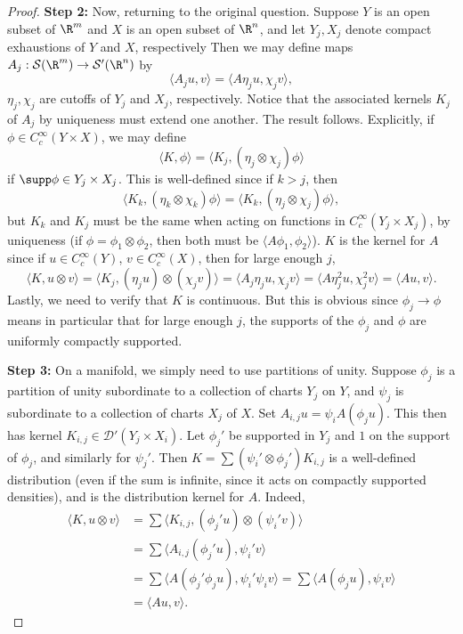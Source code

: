 \documentclass[12pt]{article}
\begin{document}
\begin{proof}
\textbf{Step 2: }Now, returning to the original question. Suppose $Y$ is an open subset of $\R^m$ and $X$ is an open subset of $\R^n$, and let $Y_j, X_j$ denote compact exhaustions of $Y$ and $X$, respectively Then we may define maps $A_j: \mathcal S(\R^m) \to \mathcal S'(\R^n)$ by
\[\langle A_ju,v\rangle = \langle A\eta_j u,\chi_j v\rangle,\] $\eta_j,\chi_j$ are cutoffs of $Y_j$ and $X_j$, respectively. Notice that the associated kernels $K_j$ of $A_j$ by uniqueness must extend one another. The result follows. Explicitly, if $\phi \in C_c^\infty(Y\times X)$, we may define
\[\langle K,\phi\rangle = \langle K_j, (\eta_j\otimes\chi_j)\phi\rangle \] if $\supp \phi \in Y_j\times X_j$. This is well-defined since if $k > j$, then 
\[\langle K_k, (\eta_k\otimes \chi_k)\phi\rangle = \langle K_k, (\eta_j\otimes \chi_j)\phi\rangle,\] but $K_k$ and $K_j$ must be the same when acting on functions in $C_c^\infty(Y_j\times X_j)$, by uniqueness (if $\phi = \phi_1\otimes \phi_2$, then both must be $\langle A\phi_1,\phi_2\rangle$). $K$ is the kernel for $A$ since if $u \in C_c^\infty(Y)$, $v \in C_c^\infty(X)$, then for large enough $j$,
\[\langle K,u\otimes v\rangle = \langle K_j,(\eta_j u)\otimes(\chi_j v)\rangle = \langle A_j \eta_j u,\chi_j v\rangle = \langle A \eta_j^2 u,\chi_j^2 v\rangle = \langle A u,v\rangle.\]
Lastly, we need to verify that $K$ is continuous. But this is obvious since $\phi_j \to \phi$ means in particular that for large enough $j$, the supports of the $\phi_j$ and $\phi$ are uniformly compactly supported.

\textbf{Step 3: }On a manifold, we simply need to use partitions of unity. Suppose $\phi_j$ is a partition of unity subordinate to a collection of charts $Y_j$ on $Y$, and $\psi_j$ is subordinate to a collection of charts $X_j$ of $X$. Set $A_{i,j}u = \psi_iA(\phi_j u)$. This then has kernel $K_{i,j} \in \mathcal D'(Y_j\times X_i)$. Let $\phi_j'$ be supported in $Y_j$ and $1$ on the support of $\phi_j$, and similarly for $\psi_j'$. Then $K=\sum (\psi_i'\otimes\phi_j')K_{i,j}$ is a well-defined distribution (even if the sum is infinite, since it acts on compactly supported densities), and is the distribution kernel for $A$. Indeed,
\begin{align*}
\langle K,u\otimes v\rangle &= \sum \langle K_{i,j}, (\phi_j'u)\otimes(\psi_i'v)\rangle\\
&= \sum \langle A_{i,j}(\phi_j' u),\psi_i' v\rangle\\
&= \sum \langle A(\phi_j'\phi_j u),\psi_i'\psi_i v\rangle = \sum \langle A(\phi_j u),\psi_i v\rangle\\
&= \langle Au,v\rangle.\end{align*}\end{proof}
\end{document}
